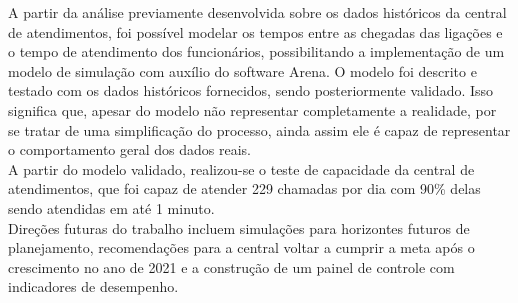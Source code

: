 A partir da análise previamente desenvolvida sobre os dados históricos da central de atendimentos, foi possível modelar os tempos entre as chegadas das ligações e o tempo de atendimento dos funcionários, possibilitando a implementação de um modelo de simulação com auxílio do software Arena. O modelo foi descrito e testado com os dados históricos fornecidos, sendo posteriormente validado. Isso significa que, apesar do modelo não representar completamente a realidade, por se tratar de uma simplificação do processo, ainda assim ele é capaz de representar o comportamento geral dos dados reais.\\
A partir do modelo validado, realizou-se o teste de capacidade da central de atendimentos, que foi capaz de atender 229 chamadas por dia com 90\% delas sendo atendidas em até 1 minuto.\\
Direções futuras do trabalho incluem simulações para horizontes futuros de planejamento, recomendações para a central voltar a cumprir a meta após o crescimento no ano de 2021 e a construção de um painel de controle com indicadores de desempenho.